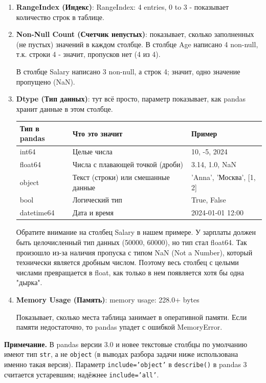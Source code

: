 \documentclass[pract]{SCWorks}
\begin{document}
\begin{enumerate}
    \item \textbf{RangeIndex (Индекс)}: RangeIndex: 4 entries, 0 to 3 - показывает количество строк в таблице.
    \item \textbf{Non-Null Count (Счетчик непустых)}: показывает, сколько заполненных (не пустых) значений в каждом 
    столбце. В столбце Age написано 4 non-null, т.к. строки 4 - значит, пропусков нет (4 из 4).
    
    В столбце Salary написано 3 non-null, а строк 4; значит, одно значение пропущено (NaN).
    \item \textbf{Dtype (Тип данных)}: тут всё просто, параметр показывает, как pandas хранит данные в этом столбце.

    \begin{table}[H]
    \centering
    \begin{tabular}{|p{2.5cm}|p{4.5cm}|p{4cm}|}
    \hline
    \textbf{Тип в pandas} & \textbf{Что это значит} & \textbf{Пример} \\ \hline
    int64   & Целые числа & 10, -5, 2024 \\ \hline
    float64 & Числа с плавающей точкой (дроби) & 3.14, 1.0, NaN \\ \hline
    object  & Текст (строки) или смешанные данные & 'Anna', 'Москва', [1, 2] \\ \hline
    bool    & Логический тип & True, False \\ \hline
    datetime64 & Дата и время & 2024-01-01 12:00 \\ \hline
    \end{tabular}
    \end{table}

    Обратите внимание на столбец Salary в нашем примере. У зарплаты должен быть целочисленный тип данных (50000, 60000), 
    но тип стал float64. Так произошло из-за наличия пропуска с типом NaN (Not a Number), который технически 
    является дробным числом. Поэтому весь столбец с целыми числами превращается в float, как только в нем 
    появляется хотя бы одна "дырка".

    \item \textbf{Memory Usage (Память)}: memory usage: 228.0+ bytes
    
    Показывает, сколько места таблица занимает в оперативной памяти. 
    Если памяти недостаточно, то pandas упадет с ошибкой MemoryError.
\end{enumerate}

\textbf{Примечание.} В pandas версии 3.0 и новее текстовые столбцы по умолчанию имеют тип \texttt{str}, а не
\texttt{object} (в выводах разбора задачи ниже использована именно такая версия). Параметр
\texttt{include='object'} в \texttt{describe()} в pandas 3 считается устаревшим; надёжнее \texttt{include='all'}.
\end{document}
